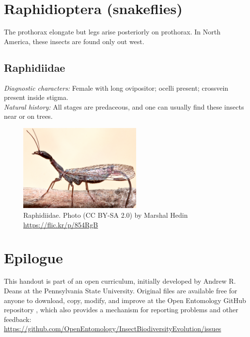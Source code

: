 \documentclass[letterpaper, 11pt]{article}
\begin{document}
\FloatBarrier
\section{Raphidioptera (snakeflies)}
The prothorax elongate but legs arise posteriorly on prothorax. In North America, these insects are found only out west.\\

\subsection{Raphidiidae}
\noindent{}\textit{Diagnostic characters:} Female with long ovipositor; ocelli present; crossvein present inside stigma.\\

\noindent{}\textit{Natural history:} All stages are predaceous, and one can usually find these insects near or on trees.\\

\begin{figure}[ht!]
  \centering
    \includegraphics[width=0.55\textwidth]{figures/RaphidiidHabitus}
  \caption{Raphidiidae. Photo (CC BY-SA 2.0) by Marshal Hedin \url{https://flic.kr/p/854RgB}}
  \label{fig:raphid}
\end{figure}

\FloatBarrier
\clearpage
\section*{Epilogue}
This handout is part of an open curriculum, initially developed by Andrew R. Deans at the Pennsylvania State University. Original files are available free for anyone to download, copy, modify, and improve at the Open Entomology GitHub repository \citep{ENT532}, which also provides a mechanism for reporting problems and other feedback:\\
\url{https://github.com/OpenEntomology/InsectBiodiversityEvolution/issues}
\end{document}

